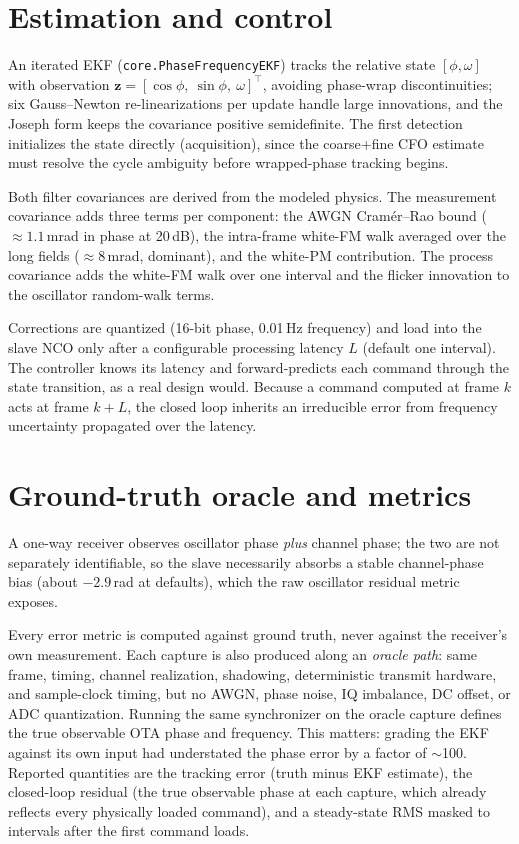 \documentclass[10pt]{article}
\newcommand{\code}[1]{\texttt{#1}}
\begin{document}
\section{Estimation and control}
An iterated EKF (\code{core.PhaseFrequencyEKF}) tracks the relative state
$[\phi,\omega]$ with observation
$\mathbf{z}=[\cos\phi,\ \sin\phi,\ \omega]^\top$, avoiding phase-wrap
discontinuities; six Gauss--Newton re-linearizations per update handle large
innovations, and the Joseph form keeps the covariance positive semidefinite.
The first detection initializes the state directly (acquisition), since the
coarse+fine CFO estimate must resolve the cycle ambiguity before wrapped-phase
tracking begins.

Both filter covariances are derived from the modeled physics. The measurement
covariance adds three terms per component: the AWGN Cram\'er--Rao bound
($\approx1.1$\,mrad in phase at 20\,dB), the intra-frame white-FM walk
averaged over the long fields ($\approx8$\,mrad, dominant), and the white-PM
contribution. The process covariance adds the white-FM walk over one interval
and the flicker innovation to the oscillator random-walk terms.

Corrections are quantized (16-bit phase, 0.01\,Hz frequency) and load into
the slave NCO only after a configurable processing latency $L$ (default one
interval). The controller knows its latency and forward-predicts each command
through the state transition, as a real design would. Because a command
computed at frame $k$ acts at frame $k{+}L$, the closed loop inherits an
irreducible error from frequency uncertainty propagated over the latency.

\section{Ground-truth oracle and metrics}
A one-way receiver observes oscillator phase \emph{plus} channel phase; the
two are not separately identifiable, so the slave necessarily absorbs a
stable channel-phase bias (about $-2.9$\,rad at defaults), which the raw
oscillator residual metric exposes.

Every error metric is computed against ground truth, never against the
receiver's own measurement. Each capture is also produced along an
\emph{oracle path}: same frame, timing, channel realization, shadowing,
deterministic transmit hardware, and sample-clock timing, but no AWGN, phase
noise, IQ imbalance, DC offset, or ADC quantization. Running the same
synchronizer on the oracle capture defines the true observable OTA phase and
frequency. This matters: grading the EKF against its own input had understated
the phase error by a factor of $\sim$100. Reported quantities are the
tracking error (truth minus EKF estimate), the closed-loop residual (the true
observable phase at each capture, which already reflects every physically
loaded command), and a steady-state RMS masked to intervals after the first
command loads.
\end{document}
